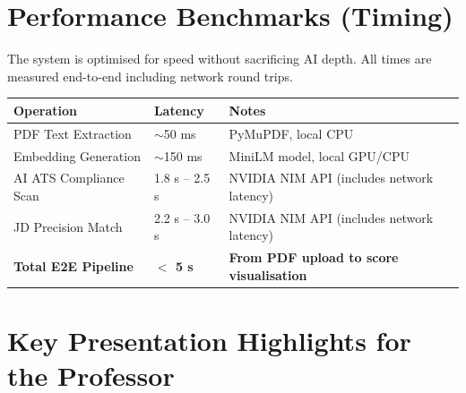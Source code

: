 \documentclass[12pt, a4paper]{article}
\begin{document}
\section{Performance Benchmarks (Timing)}

The system is optimised for speed without sacrificing AI depth. All times are measured end-to-end including network round trips.

\begingroup
\setlength{\tabcolsep}{8pt}
\renewcommand{\arraystretch}{1.4}
\begin{tabularx}{\linewidth}{@{}L{5cm} L{3.5cm} X@{}}
    \toprule
    \textbf{Operation} & \textbf{Latency} & \textbf{Notes} \\
    \midrule
    PDF Text Extraction      & $\sim$50 ms          & PyMuPDF, local CPU \\
    Embedding Generation     & $\sim$150 ms         & MiniLM model, local GPU/CPU \\
    AI ATS Compliance Scan   & 1.8 s -- 2.5 s       & NVIDIA NIM API (includes network latency) \\
    JD Precision Match       & 2.2 s -- 3.0 s       & NVIDIA NIM API (includes network latency) \\
    \textbf{Total E2E Pipeline} & \textbf{$<$ 5 s}  & \textbf{From PDF upload to score visualisation} \\
    \bottomrule
\end{tabularx}
\endgroup

\section{Key Presentation Highlights for the Professor}
\end{document}

